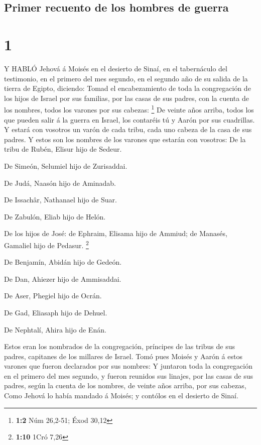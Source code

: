 \hypertarget{primer-recuento-de-los-hombres-de-guerra}{%
\subsection{Primer recuento de los hombres de
guerra}\label{primer-recuento-de-los-hombres-de-guerra}}

\hypertarget{section}{%
\section{1}\label{section}}

 Y HABLÓ Jehová á Moisés en el desierto de Sinaí, en el
tabernáculo del testimonio, en el primero del mes segundo, en el segundo
año de su salida de la tierra de Egipto, diciendo:  Tomad el
encabezamiento de toda la congregación de los hijos de Israel por sus
familias, por las casas de sus padres, con la cuenta de los nombres,
todos los varones por sus cabezas: \footnote{\textbf{1:2} Núm 26,2-51;
  Éxod 30,12}  De veinte años arriba, todos los que pueden
salir á la guerra en Israel, los contaréis tú y Aarón por sus
cuadrillas.  Y estará con vosotros un varón de cada tribu,
cada uno cabeza de la casa de sus padres.  Y estos son los
nombres de los varones que estarán con vosotros: De la tribu de Rubén,
Elisur hijo de Sedeur.

 De Simeón, Selumiel hijo de Zurisaddai.

 De Judá, Naasón hijo de Aminadab.

 De Issachâr, Nathanael hijo de Suar.

 De Zabulón, Eliab hijo de Helón.

 De los hijos de José: de Ephraim, Elisama hijo de Ammiud;
de Manasés, Gamaliel hijo de Pedasur. \footnote{\textbf{1:10} 1Cró 7,26}

 De Benjamín, Abidán hijo de Gedeón.

 De Dan, Ahiezer hijo de Ammisaddai.

 De Aser, Phegiel hijo de Ocrán.

 De Gad, Eliasaph hijo de Dehuel.

 De Nephtalí, Ahira hijo de Enán.

 Estos eran los nombrados de la congregación, príncipes de
las tribus de sus padres, capitanes de los millares de Israel.
 Tomó pues Moisés y Aarón á estos varones que fueron
declarados por sus nombres:  Y juntaron toda la
congregación en el primero del mes segundo, y fueron reunidos sus
linajes, por las casas de sus padres, según la cuenta de los nombres, de
veinte años arriba, por sus cabezas,  Como Jehová lo había
mandado á Moisés; y contólos en el desierto de Sinaí.

